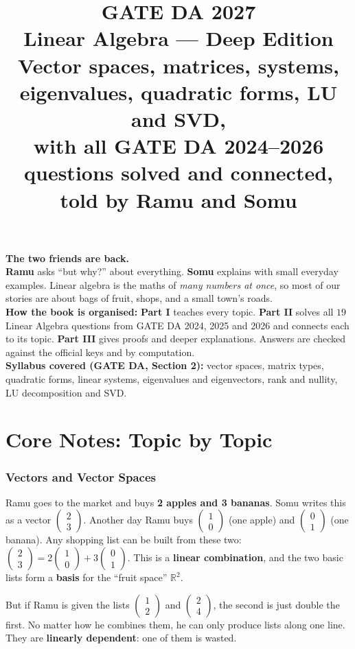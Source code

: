 \documentclass[11pt,a4paper]{article}
\title{\Huge\bfseries GATE DA 2027\\[4pt] \Large Linear Algebra --- Deep Edition\\[8pt]
\large Vector spaces, matrices, systems, eigenvalues, quadratic forms, LU and SVD,\\ with all GATE DA 2024--2026 questions solved and connected,\\ told by Ramu and Somu}
\author{}
\date{}
\newcommand{\R}{\mathbb{R}}
\newcommand{\vecc}[1]{\begin{pmatrix}#1\end{pmatrix}}
\begin{document}
\maketitle
\thispagestyle{empty}

\begin{center}
\begin{tcolorbox}[colback=yellow!10,colframe=orange!80!black,width=0.9\textwidth,breakable]
\textbf{The two friends are back.}\\
\textbf{Ramu} asks ``but why?'' about everything. \textbf{Somu} explains with small everyday examples. Linear algebra is the maths of \emph{many numbers at once}, so most of our stories are about bags of fruit, shops, and a small town's roads.\\[4pt]
\textbf{How the book is organised:} \textbf{Part I} teaches every topic. \textbf{Part II} solves all $19$ Linear Algebra questions from GATE DA 2024, 2025 and 2026 and connects each to its topic. \textbf{Part III} gives proofs and deeper explanations. Answers are checked against the official keys and by computation.\\[4pt]
\textbf{Syllabus covered (GATE DA, Section 2):} vector spaces, matrix types, quadratic forms, linear systems, eigenvalues and eigenvectors, rank and nullity, LU decomposition and SVD.
\end{tcolorbox}
\end{center}

\tableofcontents
\newpage

\part{Core Notes: Topic by Topic}
\section{Vectors and Vector Spaces}

\begin{story}
Ramu goes to the market and buys \textbf{2 apples and 3 bananas}. Somu writes this as a vector $\vecc{2\\3}$. Another day Ramu buys $\vecc{1\\0}$ (one apple) and $\vecc{0\\1}$ (one banana). Any shopping list can be built from these two: $\vecc{2\\3}=2\vecc{1\\0}+3\vecc{0\\1}$. This is a \textbf{linear combination}, and the two basic lists form a \textbf{basis} for the ``fruit space'' $\R^2$.

But if Ramu is given the lists $\vecc{1\\2}$ and $\vecc{2\\4}$, the second is just double the first. No matter how he combines them, he can only produce lists along one line. They are \textbf{linearly dependent}: one of them is wasted.
\end{story}
\end{document}
